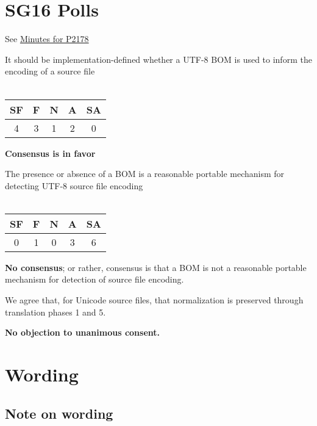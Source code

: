 \documentclass{wg21}
\begin{document}
\section{SG16 Polls}

See \href{https://github.com/sg16-unicode/sg16-meetings/blob/master/README-2020.md}{Minutes for P2178}

\begin{quoteblock}
It should be implementation-defined whether a UTF-8 BOM is used to inform the encoding of a source file
\\\\    
\begin{tabular}{|c|c|c|c|c|}
\hline
SF & F & N & A & SA \\
\hline
4 & 3 & 1 & 2 & 0 \\
\hline
\end{tabular}

\textbf{Consensus is in favor}
\end{quoteblock}

\begin{quoteblock}
The presence or absence of a BOM is a reasonable portable mechanism
for detecting UTF-8 source file encoding
\\\\
\begin{tabular}{|c|c|c|c|c|}
\hline
SF & F & N & A & SA \\
\hline
0 & 1 & 0 & 3 & 6 \\
\hline
\end{tabular}

\textbf{No consensus};  or rather,
consensus is that a BOM is not a reasonable portable mechanism for detection of source file encoding.    
\end{quoteblock}

\begin{quoteblock}
We agree that, for Unicode source files, that normalization is preserved through translation phases 1 and 5.

\textbf{No objection to unanimous consent.}
    
\end{quoteblock}

\section{Wording}

\subsection{Note on wording}
\end{document}
